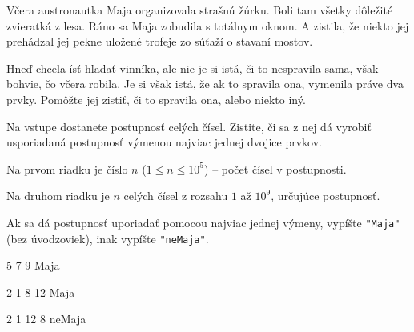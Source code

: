 




Včera austronautka Maja organizovala strašnú žúrku. Boli tam všetky dôležité zvieratká z lesa. Ráno
sa Maja zobudila s totálnym oknom. A zistila, že niekto jej prehádzal jej pekne uložené trofeje zo
súťaží o stavaní mostov.

Hneď chcela ísť hľadať vinníka, ale nie je si istá, či to nespravila sama, však bohvie, čo včera
robila. Je si však istá, že ak to spravila ona, vymenila práve dva prvky. Pomôžte jej zistiť, či to
spravila ona, alebo niekto iný.


Na vstupe dostanete postupnosť celých čísel. Zistite, či sa z nej dá vyrobiť usporiadaná postupnosť
výmenou najviac jednej dvojice prvkov.


Na prvom riadku je číslo $n$ ($1 \leq n \leq 10^5$) -- počet čísel v postupnosti.

Na druhom riadku je $n$ celých čísel z rozsahu $1$ až $10^9$, určujúce postupnosť.


Ak sa dá postupnosť uporiadať pomocou najviac jednej výmeny, vypíšte \texttt{"Maja"} (bez
úvodzoviek), inak vypíšte \texttt{"neMaja"}.


5 7 9
\vystup
Maja
\koniec

2 1 8 12
\vystup
Maja
\koniec

2 1 12 8
\vystup
neMaja
\koniec


